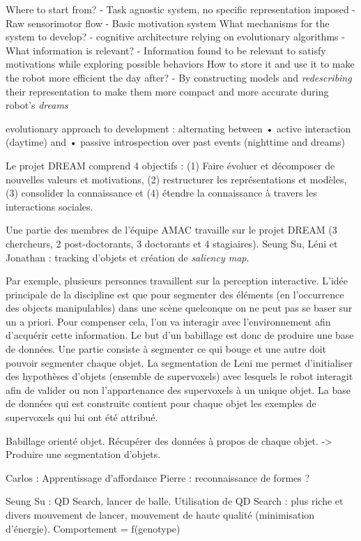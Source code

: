 \documentclass{llncs}
\begin{document}
Where to start from?
- Task agnostic system, no specific representation imposed
- Raw sensorimotor flow
- Basic motivation system
What mechanisms for the system to develop?
- cognitive architecture relying on evolutionary algorithms
- What information is relevant?
- Information found to be relevant to satisfy motivations while exploring
possible behaviors
How to store it and use it to make the robot more efficient the day after?
- By constructing models and \textit{redescribing} their representation to make
them more compact and more accurate during robot’s \textit{dreams}

evolutionary approach to
development : alternating between
• active interaction (daytime) and
• passive introspection over past
events (nighttime and dreams)

Le projet DREAM comprend 4 objectifs : (1) Faire évoluer et décomposer de nouvelles valeurs et motivations, (2) restructurer les représentations et modèles, (3) consolider la connaissance et (4) étendre la connaissance à travers les interactions sociales.



Une partie des membres de l'équipe AMAC travaille sur le projet DREAM (3 chercheurs, 2 post-doctorants, 3 doctorants et 4 stagiaires).
Seung Su, Léni et Jonathan : tracking d'objets et création de \textit{saliency map}.

Par exemple, plusieurs personnes travaillent sur la perception interactive. L'idée principale de la discipline est que pour segmenter des éléments (en l'occurrence des objects manipulables) dans une scène quelconque on ne peut pas se baser sur un a priori. Pour compenser cela, l'on va interagir avec l'environnement afin d'acquérir cette information. Le but d'un babillage est donc de produire une base de données. Une partie consiste à segmenter ce qui bouge et une autre doit pouvoir segmenter chaque objet. La segmentation de Leni me permet d'initialiser des hypothèses d'objets (ensemble de supervoxels) avec lesquels le robot interagit afin de valider ou non l'appartenance des supervoxels à un unique objet. La base de données qui est construite contient pour chaque objet les exemples de supervoxels qui lui ont été attribué.

Babillage orienté objet. Récupérer des données à propos de chaque objet. -> Produire une segmentation d'objets.

Carlos : Apprentissage d'affordance
Pierre : reconnaissance de formes ?

Seung Su : QD Search, lancer de balle. Utilisation de QD Search : plus riche et divers mouvement de lancer, mouvement de haute qualité (minimisation d'énergie).
Comportement = f(genotype)
\end{document}
